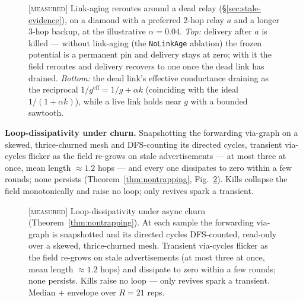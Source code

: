 \documentclass[11pt]{article}
\theoremstyle{plain}
\numberwithin{equation}{section}
\begin{document}
\begin{figure}[tbp]
\centering

\caption{\textsc{[measured]} Link-aging reroutes around a dead relay (§\ref{sec:stale-evidence}), on a diamond with a preferred 2-hop relay $a$ and a longer 3-hop backup, at the illustrative $\alpha=0.04$. \emph{Top:} delivery after $a$ is killed — without link-aging (the \texttt{NoLinkAge} ablation) the frozen potential is a permanent pin and delivery stays at zero; with it the field reroutes and delivery recovers to one once the dead link has drained. \emph{Bottom:} the dead link's effective conductance draining as the reciprocal $1/g^{\mathrm{eff}}=1/g+\alpha k$ (coinciding with the ideal $1/(1+\alpha k)$), while a live link holds near $g$ with a bounded sawtooth.}
\label{fig:linkaging}
\end{figure}

\textbf{Loop-dissipativity under churn.} Snapshotting the forwarding via-graph on a skewed, thrice-churned mesh and DFS-counting its directed cycles, transient via-cycles flicker as the field re-grows on stale advertisements — at most three at once, mean length $\approx 1.2$ hops — and every one dissipates to zero within a few rounds; none persists (Theorem~\ref{thm:nontrapping}, Fig.~\ref{fig:loops}). Kills collapse the field monotonically and raise no loop; only revives spark a transient.

\begin{figure}[tbp]
\centering

\caption{\textsc{[measured]} Loop-dissipativity under async churn (Theorem~\ref{thm:nontrapping}). At each sample the forwarding via-graph is snapshotted and its directed cycles DFS-counted, read-only over a skewed, thrice-churned mesh. Transient via-cycles flicker as the field re-grows on stale advertisements (at most three at once, mean length $\approx 1.2$ hops) and dissipate to zero within a few rounds; none persists. Kills raise no loop — only revives spark a transient. Median $+$ envelope over $R=21$ reps.}
\label{fig:loops}
\end{figure}
\end{document}
